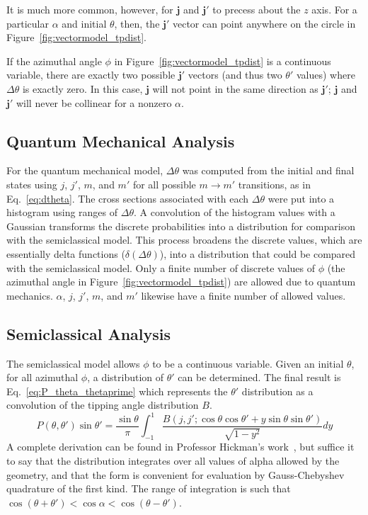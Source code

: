 \documentclass[letterpaper,11pt]{article}
\newcommand{\vectorize}[1]{\boldsymbol{#1}}
\begin{document}
It is much more common, however, for $\vectorize{j}$ and $\vectorize{j'}$ to precess about the $z$
axis.  For a particular $\alpha$ and initial $\theta$, then, the $\vectorize{j'}$ vector
can point anywhere on the circle in Figure~\ref{fig:vectormodel_tpdist}.

If the azimuthal angle $\phi$ in Figure~\ref{fig:vectormodel_tpdist} is a
continuous variable, there are exactly two possible $\vectorize{j'}$ vectors (and thus two
$\theta'$ values) where $\Delta\theta$ is exactly zero.  In this case,
$\vectorize{j}$ will not point in the same direction as $\vectorize{j'}$; $\vectorize{j}$ and $\vectorize{j'}$ will
never be collinear for a nonzero $\alpha$.

\subsection{Quantum Mechanical Analysis}
For the quantum mechanical model, $\Delta\theta$ was computed from the initial and final states
using $j$, $j'$, $m$, and $m'$ for all possible $m\rightarrow m'$ transitions,
as in Eq.~\ref{eq:dtheta}.  The cross sections associated with each
$\Delta\theta$ were put into a histogram using ranges of $\Delta\theta$.  A
convolution of the histogram values with a Gaussian transforms the discrete
probabilities into a distribution for comparison with the semiclassical model. This
process broadens the discrete values, which are essentially delta functions
($\delta\left(\Delta\theta\right)$), into a distribution that could be compared
with the semiclassical model.  Only a finite number of discrete values of $\phi$ (the
azimuthal angle in Figure~\ref{fig:vectormodel_tpdist}) are allowed due to
quantum mechanics. $\alpha$, $j$, $j'$, $m$, and $m'$ likewise have a finite
number of allowed values.

\subsection{Semiclassical Analysis}
The semiclassical model allows $\phi$ to be a continuous variable.  Given an initial
$\theta$, for all azimuthal $\phi$, a distribution of $\theta'$ can be
determined.  The final result is Eq.~\ref{eq:P_theta_thetaprime} which
represents the $\theta'$ distribution as a convolution of the tipping angle
distribution $B$.
\begin{equation}
    P(\theta,\theta')\sin\theta'=\frac{\sin\theta}{\pi}\int_{-1}^{1}\frac{B(j,j';\cos\theta\cos\theta'+y\sin\theta\sin\theta')}{\sqrt{1-y^2}}dy
    \label{eq:P_theta_thetaprime}
\end{equation}
A complete derivation can be found in Professor Hickman's work~\cite{Hic15},
but suffice it to say that the distribution integrates over all values of alpha
allowed by the geometry, and that the form is convenient for evaluation by
Gauss-Chebyshev quadrature of the first kind.  The range of integration is such
that $\cos\left(\theta+\theta'\right)<\cos\alpha<\cos\left(\theta-\theta'\right)$.
\end{document}
